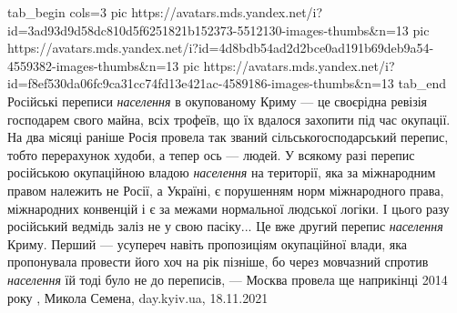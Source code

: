 \ifcmt
  tab_begin cols=3
     pic https://avatars.mds.yandex.net/i?id=3ad93d9d58dc810d5f6251821b152373-5512130-images-thumbs&n=13
     pic https://avatars.mds.yandex.net/i?id=4d8bdb54ad2d2bce0ad191b69deb9a54-4559382-images-thumbs&n=13
		 pic https://avatars.mds.yandex.net/i?id=f8ef530da06fc9ca31cc74fd13e421ac-4589186-images-thumbs&n=13
  tab_end
\fi
Російські переписи \emph{населення} в окупованому Криму — це своєрідна ревізія
господарем свого майна, всіх трофеїв, що їх вдалося захопити під час окупації.
На два місяці раніше Росія провела так званий сільськогосподарський перепис,
тобто перерахунок худоби, а тепер ось — людей. У всякому разі перепис
російською окупаційною владою \emph{населення} на території, яка за міжнародним правом
належить не Росії, а Україні, є порушенням норм міжнародного права, міжнародних
конвенцій і є за межами нормальної людської логіки. І цього разу російський
ведмідь заліз не у свою пасіку...  Це вже другий перепис \emph{населення} Криму.
Перший — усупереч навіть пропозиціям окупаційної влади, яка пропонувала
провести його хоч на рік пізніше, бо через мовчазний спротив \emph{населення} їй тоді
було не до переписів, — Москва провела ще наприкінці 2014 року
, 
Микола Семена, day.kyiv.ua, 18.11.2021
